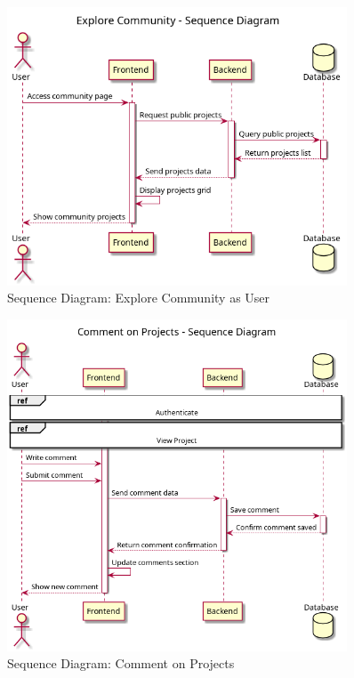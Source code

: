 \begin{figure}[H]
\centering
\includegraphics[width=0.9\textwidth]{conception/SprintV/sequence_diagrams/sequence_communityInteraction_6_1_ExploreCommunityAsUser.png}
\caption{Sequence Diagram: Explore Community as User}
\label{fig:seq_explore_community}
\end{figure}

\begin{figure}[H]
\centering
\includegraphics[width=0.9\textwidth]{conception/SprintV/sequence_diagrams/sequence_communityInteraction_6_3_CommentOnProjects.png}
\caption{Sequence Diagram: Comment on Projects}
\label{fig:seq_comment_projects}
\end{figure}

